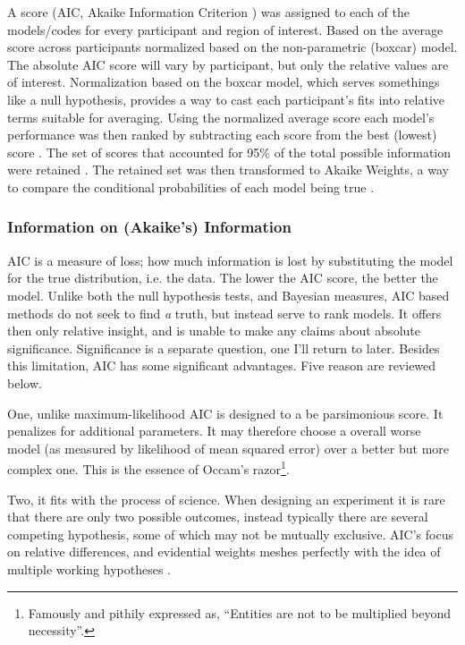 \documentclass[doc,12pt]{apa}        %
\begin{document}
A score (AIC, Akaike Information Criterion \cite{Akaike:1974p9530}) was assigned to each of the models/codes for every participant and region of interest.  Based on the average score across participants normalized based on the non-parametric (boxcar) model.  The absolute AIC score will vary by participant, but only the relative values are of interest.  Normalization based on the boxcar model, which serves somethings like a null hypothesis, provides a way to cast each participant's fits into relative terms suitable for averaging.  Using the normalized average score each model's performance was then ranked by subtracting each score from the best (lowest) score \cite{Anderson:2000p9475}.  The set of scores that accounted for 95\% of the total possible information were retained \cite{Anderson:2000p9475}.  The retained set was then transformed to Akaike Weights, a way to compare the conditional probabilities of each model being true \cite{Wagenmakers:2004p9472}.

\subsubsection{Information on (Akaike's) Information}
\label{subsub:way}
AIC is a measure of loss; how much information is lost by substituting the model for the true distribution, i.e. the data.  The lower the AIC score, the better the model.  Unlike both the null hypothesis tests, and Bayesian measures, AIC based methods do not seek to find \emph{a} truth, but instead serve to rank models.  It offers then only relative insight, and is unable to make any claims about absolute significance.  Significance is a separate question, one I'll return to later.  Besides this limitation, AIC has some significant advantages. Five reason are reviewed below.

One, unlike maximum-likelihood AIC is designed to a be parsimonious score.  It penalizes for additional parameters.  It may therefore choose a overall worse model (as measured by likelihood of mean squared error) over a better but more complex one. This is the essence of Occam's razor\footnote{Famously and pithily expressed as, ``Entities are not to be multiplied beyond necessity''.}. 

Two, it fits with the process of science.  When designing an experiment it is rare that there are only two possible outcomes, instead typically there are several competing hypothesis, some of which may not be mutually exclusive.  AIC's focus on relative differences, and evidential weights meshes perfectly with the idea of multiple working hypotheses \cite{Burnham:2004p9621}. 
\end{document}
